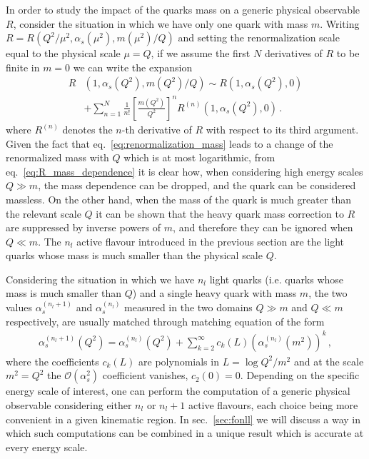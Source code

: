 %
In order to study the impact of the quarks mass on a generic physical observable $R$, consider
the situation in which we have only one quark with mass $m$.
Writing $R = R\left(Q^2/\mu^2, \alpha_s\left(\mu^2\right),m\left(\mu^2\right)/Q \right)$ 
and setting the renormalization scale equal to the physical scale $\mu=Q$,
if we assume the first $N$ derivatives of $R$ to be finite in $m=0$ 
we can write the expansion
\begin{align}
    \label{eq:R_mass_dependence}
    R&\left(1, \alpha_s\left(Q^2\right),m\left(Q^2\right)/Q \right) \sim
    R\left(1, \alpha_s\left(Q^2\right),0 \right)\nonumber \\
    & + \sum_{n=1}^{N}\frac{1}{n!}\left[\frac{m\left(Q^2\right)}{Q^2}\right]^n R^{(n)}\left(1,\alpha_s\left(Q^2\right),0\right)\,.
\end{align}
where $R^{(n)}$ denotes the $n$-th derivative of $R$ with respect to its third argument. 
Given the fact that eq.~\eqref{eq:renormalization_mass} leads to a change of the renormalized mass with $Q$ 
which is at most logarithmic, from eq.~\eqref{eq:R_mass_dependence} it is clear how, when considering 
high energy scales $Q \gg m$, the mass dependence can be dropped, and the quark can be considered massless.
%
On the other hand, when the mass of the quark is much greater than the relevant scale $Q$ it can be shown 
that the heavy quark mass correction to $R$ are suppressed by inverse powers of $m$, and therefore they can be ignored when
$Q \ll m$. 
%
The $n_l$ active flavour introduced in the previous section are the light quarks whose mass is much smaller than
the physical scale $Q$.

%
Considering the situation in which we have $n_l$ light quarks (i.e. quarks whose mass is much smaller than $Q$)
and a single heavy quark with mass $m$, the two values $\alpha_s^{(n_l+1)}$ and $\alpha_s^{(n_l)}$ 
measured in the two domains $Q \gg m$ and $Q \ll m$ respectively,
are usually matched through matching equation of the form
\begin{align}
    \alpha_s^{(n_l+1)}\left(Q^2\right) = 
    \alpha_s^{(n_l)}\left(Q^2\right) 
    + \sum_{k=2}^{\infty} c_k\left(L\right) \left(\alpha_s^{(n_l)}\left(m^2\right)\right)^k\,,
\end{align}
where the coefficients $c_k\left(L\right)$ are polynomials in $L=\log Q^2/m^2$ and at the scale $m^2=Q^2$ 
the $\mathcal{O}\left(\alpha_s^2\right)$ coefficient vanishes, $c_2\left(0\right)=0$.
Depending on the specific energy scale of interest,
one can perform the computation of a generic physical observable considering either $n_l$ or $n_l + 1$ active flavours,
each choice being more convenient in a given kinematic region. 
In sec.~\ref{sec:fonll} we will discuss a way in which such computations can be combined in a unique result which
is accurate at every energy scale.

